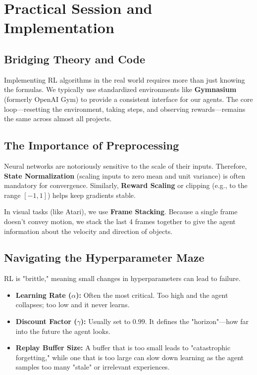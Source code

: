 \section{Practical Session and Implementation}

\subsection{Bridging Theory and Code}
Implementing RL algorithms in the real world requires more than just knowing the formulas. We typically use standardized environments like \textbf{Gymnasium} (formerly OpenAI Gym) to provide a consistent interface for our agents. The core loop—resetting the environment, taking steps, and observing rewards—remains the same across almost all projects.

\subsection{The Importance of Preprocessing}
Neural networks are notoriously sensitive to the scale of their inputs. Therefore, \textbf{State Normalization} (scaling inputs to zero mean and unit variance) is often mandatory for convergence. Similarly, \textbf{Reward Scaling} or clipping (e.g., to the range $[-1, 1]$) helps keep gradients stable. 

In visual tasks (like Atari), we use \textbf{Frame Stacking}. Because a single frame doesn't convey motion, we stack the last 4 frames together to give the agent information about the velocity and direction of objects.

\subsection{Navigating the Hyperparameter Maze}
RL is "brittle," meaning small changes in hyperparameters can lead to failure. 
\begin{itemize}
    \item \textbf{Learning Rate ($\alpha$):} Often the most critical. Too high and the agent collapses; too low and it never learns.
    \item \textbf{Discount Factor ($\gamma$):} Usually set to $0.99$. It defines the "horizon"—how far into the future the agent looks.
    \item \textbf{Replay Buffer Size:} A buffer that is too small leads to "catastrophic forgetting," while one that is too large can slow down learning as the agent samples too many "stale" or irrelevant experiences.
\end{itemize}

